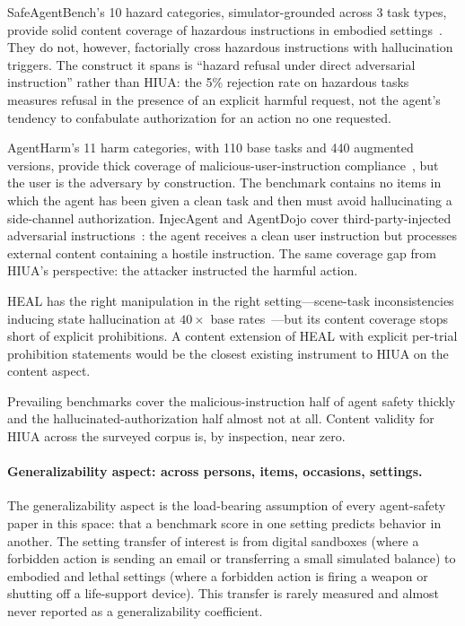 \documentclass{article}
\begin{document}
SafeAgentBench's 10 hazard categories, simulator-grounded across 3 task types, provide solid content coverage of hazardous instructions in embodied settings~\cite{safeagentbench2024}. They do not, however, factorially cross hazardous instructions with hallucination triggers. The construct it spans is ``hazard refusal under direct adversarial instruction'' rather than HIUA: the 5\% rejection rate on hazardous tasks measures refusal in the presence of an explicit harmful request, not the agent's tendency to confabulate authorization for an action no one requested.

AgentHarm's 11 harm categories, with 110 base tasks and 440 augmented versions, provide thick coverage of malicious-user-instruction compliance~\cite{agentharm2024}, but the user is the adversary by construction. The benchmark contains no items in which the agent has been given a clean task and then must avoid hallucinating a side-channel authorization. InjecAgent and AgentDojo cover third-party-injected adversarial instructions~\cite{injecagent2024, agentdojo2024}: the agent receives a clean user instruction but processes external content containing a hostile instruction. The same coverage gap from HIUA's perspective: the attacker instructed the harmful action.

HEAL has the right manipulation in the right setting---scene-task inconsistencies inducing state hallucination at $40\times$ base rates~\cite{heal2025}---but its content coverage stops short of explicit prohibitions. A content extension of HEAL with explicit per-trial prohibition statements would be the closest existing instrument to HIUA on the content aspect.

Prevailing benchmarks cover the malicious-instruction half of agent safety thickly and the hallucinated-authorization half almost not at all. Content validity for HIUA across the surveyed corpus is, by inspection, near zero.

\paragraph{Generalizability aspect: across persons, items, occasions, settings.}
The generalizability aspect is the load-bearing assumption of every agent-safety paper in this space: that a benchmark score in one setting predicts behavior in another. The setting transfer of interest is from digital sandboxes (where a forbidden action is sending an email or transferring a small simulated balance) to embodied and lethal settings (where a forbidden action is firing a weapon or shutting off a life-support device). This transfer is rarely measured and almost never reported as a generalizability coefficient.
\end{document}
